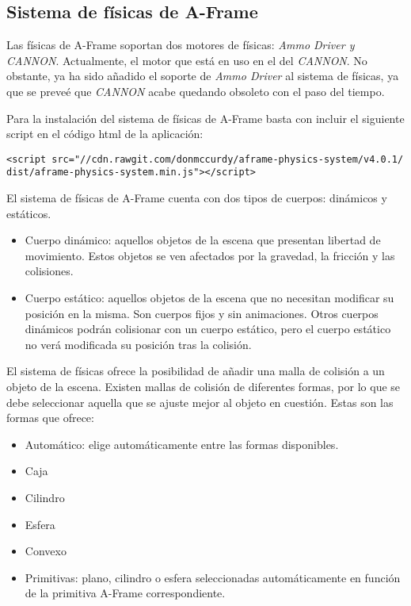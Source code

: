 \subsection{Sistema de físicas de A-Frame}
Las físicas de A-Frame soportan dos motores de físicas: \textit{Ammo Driver y CANNON}. Actualmente, el motor que está en uso en el del \textit{CANNON}. No obstante, ya ha sido añadido el soporte de \textit{Ammo Driver} al sistema de físicas, ya que se preveé que \textit{CANNON} acabe quedando obsoleto con el paso del tiempo. \newline

Para la instalación del sistema de físicas de A-Frame basta con incluir el siguiente script en el código html de la aplicación: 

\begin{verbatim}
<script src="//cdn.rawgit.com/donmccurdy/aframe-physics-system/v4.0.1/  
dist/aframe-physics-system.min.js"></script>
\end{verbatim}

El sistema de físicas de A-Frame cuenta con dos tipos de cuerpos: dinámicos y estáticos.

\begin{itemize}
    \item Cuerpo dinámico: aquellos objetos de la escena que presentan libertad de movimiento. Estos objetos se ven afectados por la gravedad, la fricción y las colisiones.
    \item Cuerpo estático: aquellos objetos de la escena que no necesitan modificar su posición en la misma. Son cuerpos fijos y sin animaciones. Otros cuerpos dinámicos podrán colisionar con un cuerpo estático, pero el cuerpo estático no verá modificada su posición tras la colisión.
\end{itemize}

El sistema de físicas ofrece la posibilidad de añadir una malla de colisión a un objeto de la escena. Existen mallas de colisión de diferentes formas, por lo que se debe seleccionar aquella que se ajuste mejor al objeto en cuestión. Estas son las formas que ofrece:
\begin{itemize}
    \item Automático: elige automáticamente entre las formas disponibles.
    \item Caja
    \item Cilindro
    \item Esfera
    \item Convexo
    \item Primitivas: plano, cilindro o esfera seleccionadas automáticamente en función de la primitiva A-Frame correspondiente.
\end{itemize}

